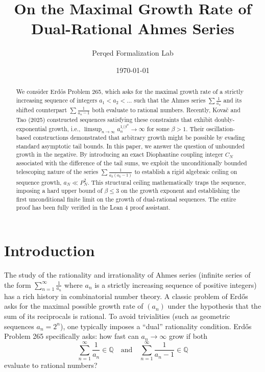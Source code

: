 \documentclass[11pt,reqno]{amsart}
\title[Maximal Growth of Dual-Rational Ahmes Series]{On the Maximal Growth Rate of \\ Dual-Rational Ahmes Series}
\author{Perqed Formalization Lab}
\date{\today}
\theoremstyle{definition}
\newcommand{\Q}{\mathbb{Q}}
\begin{document}
\begin{abstract}
We consider Erd\H{o}s Problem 265, which asks for the maximal growth rate of a strictly increasing sequence of integers $a_1 < a_2 < \dots$ such that the Ahmes series $\sum \frac{1}{a_n}$ and its shifted counterpart $\sum \frac{1}{a_n - 1}$ both evaluate to rational numbers. Recently, Kova\v{c} and Tao (2025) constructed sequences satisfying these constraints that exhibit doubly-exponential growth, i.e., $\limsup_{n \to \infty} a_n^{1/\beta^n} \to \infty$ for some $\beta > 1$. Their oscillation-based constructions demonstrated that arbitrary growth might be possible by evading standard asymptotic tail bounds. In this paper, we answer the question of unbounded growth in the negative. By introducing an exact Diophantine coupling integer $C_N$ associated with the difference of the tail sums, we exploit the unconditionally bounded telescoping nature of the series $\sum \frac{1}{a_k(a_k-1)}$ to establish a rigid algebraic ceiling on sequence growth, $a_N \ll P_N^2$. This structural ceiling mathematically traps the sequence, imposing a hard upper bound of $\beta \le 3$ on the growth exponent and establishing the first unconditional finite limit on the growth of dual-rational sequences. The entire proof has been fully verified in the Lean 4 proof assistant.
\end{abstract}

\maketitle

\section{Introduction}

The study of the rationality and irrationality of Ahmes series (infinite series of the form $\sum_{n=1}^\infty \frac{1}{a_n}$ where $a_n$ is a strictly increasing sequence of positive integers) has a rich history in combinatorial number theory. A classic problem of Erd\H{o}s asks for the maximal possible growth rate of $(a_n)$ under the hypothesis that the sum of its reciprocals is rational. To avoid trivialities (such as geometric sequences $a_n = 2^n$), one typically imposes a ``dual'' rationality condition. Erd\H{o}s Problem 265 specifically asks: how fast can $a_n \to \infty$ grow if both
\begin{equation}\label{eq:dual_rat}
\sum_{n=1}^\infty \frac{1}{a_n} \in \Q \quad \text{and} \quad \sum_{n=1}^\infty \frac{1}{a_n - 1} \in \Q 
\end{equation}
evaluate to rational numbers?
\end{document}
